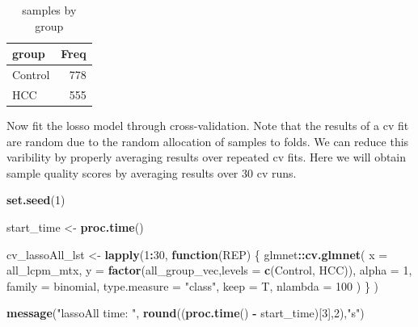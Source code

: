 \documentclass[
]{book}
\newenvironment{Shaded}{\begin{snugshade}}{\end{snugshade}}
\newcommand{\ControlFlowTok}[1]{\textcolor[rgb]{0.13,0.29,0.53}{\textbf{#1}}}
\newcommand{\DataTypeTok}[1]{\textcolor[rgb]{0.13,0.29,0.53}{#1}}
\newcommand{\DecValTok}[1]{\textcolor[rgb]{0.00,0.00,0.81}{#1}}
\newcommand{\KeywordTok}[1]{\textcolor[rgb]{0.13,0.29,0.53}{\textbf{#1}}}
\newcommand{\NormalTok}[1]{#1}
\newcommand{\OperatorTok}[1]{\textcolor[rgb]{0.81,0.36,0.00}{\textbf{#1}}}
\newcommand{\StringTok}[1]{\textcolor[rgb]{0.31,0.60,0.02}{#1}}
\begin{document}
\begin{table}

\caption{\label{tab:get-all-data}samples by group}
\centering
\begin{tabular}[t]{l|r}
\hline
group & Freq\\
\hline
Control & 778\\
\hline
HCC & 555\\
\hline
\end{tabular}
\end{table}

Now fit the losso model through cross-validation.
Note that the results of a cv fit are random due to the
random allocation of samples to folds. We can reduce this
varibility by properly averaging results over repeated cv fits.
Here we will obtain sample quality scores by averaging results
over 30 cv runs.

\begin{Shaded}
\begin{Highlighting}[]
\KeywordTok{set.seed}\NormalTok{(}\DecValTok{1}\NormalTok{)}

\NormalTok{start\_time <{-}}\StringTok{  }\KeywordTok{proc.time}\NormalTok{()}

\NormalTok{cv\_lassoAll\_lst <{-}}\StringTok{ }\KeywordTok{lapply}\NormalTok{(}\DecValTok{1}\OperatorTok{:}\DecValTok{30}\NormalTok{, }\ControlFlowTok{function}\NormalTok{(REP) \{}
\NormalTok{glmnet}\OperatorTok{::}\KeywordTok{cv.glmnet}\NormalTok{(}
 \DataTypeTok{x =}\NormalTok{ all\_lcpm\_mtx,}
 \DataTypeTok{y =} \KeywordTok{factor}\NormalTok{(all\_group\_vec,}\DataTypeTok{levels =} \KeywordTok{c}\NormalTok{(}\StringTok{\textquotesingle{}Control\textquotesingle{}}\NormalTok{, }\StringTok{\textquotesingle{}HCC\textquotesingle{}}\NormalTok{)),}
 \DataTypeTok{alpha =} \DecValTok{1}\NormalTok{,}
 \DataTypeTok{family =} \StringTok{\textquotesingle{}binomial\textquotesingle{}}\NormalTok{,}
 \DataTypeTok{type.measure  =}  \StringTok{"class"}\NormalTok{,}
 \DataTypeTok{keep =}\NormalTok{ T,}
 \DataTypeTok{nlambda =} \DecValTok{100}
\NormalTok{)}
\NormalTok{\}}
\NormalTok{)}

\KeywordTok{message}\NormalTok{(}\StringTok{"lassoAll time: "}\NormalTok{, }\KeywordTok{round}\NormalTok{((}\KeywordTok{proc.time}\NormalTok{() }\OperatorTok{{-}}\StringTok{ }\NormalTok{start\_time)[}\DecValTok{3}\NormalTok{],}\DecValTok{2}\NormalTok{),}\StringTok{"s"}\NormalTok{)}
\end{Highlighting}
\end{Shaded}
\end{document}
